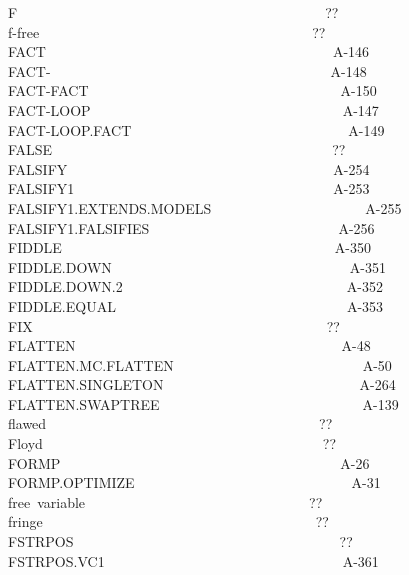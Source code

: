 \documentclass[11pt]{book}
\newenvironment{pubasis}{\begin{flushleft}\ttfamily\small}{\normalsize\rmfamily\end{flushleft}}
\begin{document}
\begin{pubasis}
F~~~~~~~~~~~~~~~~~~~~~~~~~~~~~~~~~~~~~~~~~~~~??\\
f-free~~~~~~~~~~~~~~~~~~~~~~~~~~~~~~~~~~~~~~~??\\
FACT~~~~~~~~~~~~~~~~~~~~~~~~~~~~~~~~~~~~~~~~~A-146\\
FACT-~~~~~~~~~~~~~~~~~~~~~~~~~~~~~~~~~~~~~~~~A-148\\
FACT-FACT~~~~~~~~~~~~~~~~~~~~~~~~~~~~~~~~~~~~A-150\\
FACT-LOOP~~~~~~~~~~~~~~~~~~~~~~~~~~~~~~~~~~~~A-147\\
FACT-LOOP.FACT~~~~~~~~~~~~~~~~~~~~~~~~~~~~~~~A-149\\
FALSE~~~~~~~~~~~~~~~~~~~~~~~~~~~~~~~~~~~~~~~~??\\
FALSIFY~~~~~~~~~~~~~~~~~~~~~~~~~~~~~~~~~~~~~~A-254\\
FALSIFY1~~~~~~~~~~~~~~~~~~~~~~~~~~~~~~~~~~~~~A-253\\
FAL\-SI\-FY1.EXTENDS.MODELS~~~~~~~~~~~~~~~~~~~~~~A-255\\
FAL\-SI\-FY1.FALSIFIES~~~~~~~~~~~~~~~~~~~~~~~~~~~A-256\\
FIDDLE~~~~~~~~~~~~~~~~~~~~~~~~~~~~~~~~~~~~~~~A-350\\
FIDDLE.DOWN~~~~~~~~~~~~~~~~~~~~~~~~~~~~~~~~~~A-351\\
FIDDLE.DOWN.2~~~~~~~~~~~~~~~~~~~~~~~~~~~~~~~~A-352\\
FIDDLE.EQUAL~~~~~~~~~~~~~~~~~~~~~~~~~~~~~~~~~A-353\\
FIX~~~~~~~~~~~~~~~~~~~~~~~~~~~~~~~~~~~~~~~~~~??\\
FLATTEN~~~~~~~~~~~~~~~~~~~~~~~~~~~~~~~~~~~~~~A-48\\
FLAT\-TEN.MC.FLAT\-TEN~~~~~~~~~~~~~~~~~~~~~~~~~~~A-50\\
FLAT\-TEN.SINGLE\-TON~~~~~~~~~~~~~~~~~~~~~~~~~~~~A-264\\
FLAT\-TEN.SWAPTREE~~~~~~~~~~~~~~~~~~~~~~~~~~~~~A-139\\
flawed~~~~~~~~~~~~~~~~~~~~~~~~~~~~~~~~~~~~~~~??\\
Floyd~~~~~~~~~~~~~~~~~~~~~~~~~~~~~~~~~~~~~~~~??\\
FORMP~~~~~~~~~~~~~~~~~~~~~~~~~~~~~~~~~~~~~~~~A-26\\
FORMP.OPTIMIZE~~~~~~~~~~~~~~~~~~~~~~~~~~~~~~~A-31\\
free~variable~~~~~~~~~~~~~~~~~~~~~~~~~~~~~~~~??\\
fringe~~~~~~~~~~~~~~~~~~~~~~~~~~~~~~~~~~~~~~~??\\
FSTRPOS~~~~~~~~~~~~~~~~~~~~~~~~~~~~~~~~~~~~~~??\\
FSTRPOS.VC1~~~~~~~~~~~~~~~~~~~~~~~~~~~~~~~~~~A-361\\

\end{pubasis}
\end{document}
